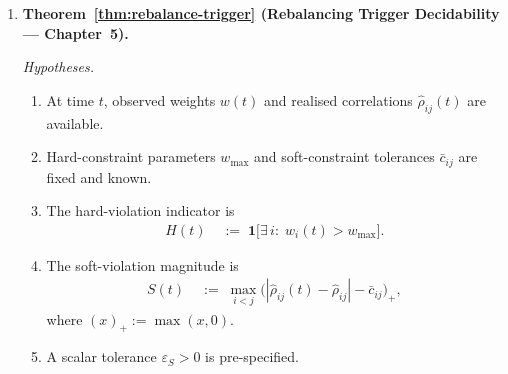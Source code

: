 \documentclass[12pt,openany]{book}
\newcommand{\bfw}{\mathbf{w}}
\numberwithin{equation}{chapter}
\theoremstyle{plain}
\theoremstyle{definition}
\theoremstyle{remark}
\def\bfw{w}%
\begin{document}
\smallskip
\begin{enumerate}[label=\textbf{C\arabic*.}, leftmargin=*, widest=C4,
                  itemsep=6pt, parsep=2pt]

  \item \textbf{Theorem~\ref{thm:rebalance-trigger}
        (Rebalancing Trigger Decidability — Chapter~5).}

        \emph{Hypotheses.}
        \begin{enumerate}[label=(\roman*), itemsep=2pt]
          \item At time $t$, observed weights $\bfw(t)$ and
                realised correlations $\hat{\rho}_{ij}(t)$ are
                available.
          \item Hard-constraint parameters $w_{\max}$ and
                soft-constraint tolerances $\bar{c}_{ij}$ are fixed
                and known.
          \item The hard-violation indicator is
                \begin{align}
                  H(t)
                    &\;:=\;
                      \mathbf{1}\bigl[
                        \exists\, i:\; w_i(t) > w_{\max}
                      \bigr].
                  \label{eq:sum-hard-ind}
                \end{align}
          \item The soft-violation magnitude is
                \begin{align}
                  S(t)
                    &\;:=\;
                      \max_{i < j}
                      \bigl(
                        |\hat{\rho}_{ij}(t) - \hat{\rho}_{ij}|
                        - \bar{c}_{ij}
                      \bigr)_+,
                  \label{eq:sum-soft-mag}
                \end{align}
                where $(x)_+ := \max(x,0)$.
          \item A scalar tolerance $\varepsilon_S > 0$ is pre-specified.
        \end{enumerate}


\end{enumerate}
\end{document}

